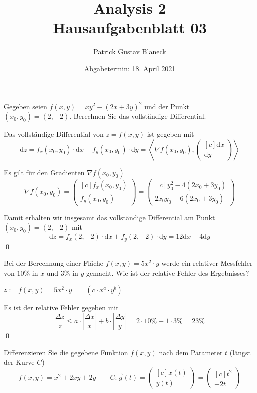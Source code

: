\documentclass[answers]{exam}
\title{Analysis 2 \\ \large{Hausaufgabenblatt 03}}
\author{Patrick Gustav Blaneck}
\date{Abgabetermin: 18. April 2021}
\newcommand{\abs}[1]{\left| #1 \right|}
\newcommand{\dx}{\mathrm{d}x} %
\newcommand{\dy}{\mathrm{d}y} %
\newcommand{\dz}{\mathrm{d}z} %
\newcommand{\scalarprod}[1]{\left\langle #1 \right\rangle}
\newcommand{\vektor}[1]{\begin{pmatrix*}[c] #1 \end{pmatrix*}}
\begin{document}
\maketitle
\begin{questions}
    \question
    Gegeben seien $f(x, y) = xy^2 - (2x+3y)^2$ und der Punkt $(x_0, y_0) = (2, -2)$.
    Berechnen Sie das vollständige Differential.
    \begin{solution}
        Das vollständige Differential von $z = f(x, y)$ ist gegeben mit
        $$
            \dz = f_x(x_0, y_0) \cdot \dx + f_y(x_0, y_0) \cdot \dy = \scalarprod{\nabla f(x_0, y_0), \vektor{\dx \\ \dy}}
        $$

        Es gilt für den Gradienten $\nabla f(x_0, y_0)$
        $$
            \nabla f(x_0, y_0) = \vektor{f_x(x_0, y_0) \\ f_y(x_0, y_0)} = \vektor{y_0^2 - 4(2x_0+3y_0) \\ 2x_0y_0 - 6(2x_0+3y_0)}
        $$

        Damit erhalten wir insgesamt das vollständige Differential am Punkt $(x_0, y_0) = (2, -2)$ mit
        $$
            \dz = f_x(2, -2) \cdot \dx + f_y(2, -2) \cdot \dy = 12\dx + 4\dy
        $$\qed
    \end{solution}

    \newpage

    \question
    Bei der Berechnung einer Fläche $f(x, y) = 5x^2 \cdot y$ werde ein relativer Messfehler von $10\%$ in $x$ und $3\%$ in $y$ gemacht.
    Wie ist der relative Fehler des Ergebnisses?
    \begin{solution}
        $z := f(x, y) = 5x^2 \cdot y \qquad \left( c \cdot x^a \cdot y^b\right)$

        Es ist der relative Fehler gegeben mit
        $$
            \frac{\varDelta z}{z} \leq a \cdot \abs{\frac{\varDelta x}{x}} + b \cdot \abs{\frac{\varDelta y}{y}} = 2 \cdot 10\% + 1\cdot 3\% = 23\%
        $$\qed
    \end{solution}

    \newpage

    \question
    Differenzieren Sie die gegebene Funktion $f(x,y)$ nach dem Parameter $t$ (längst der Kurve $C$)
    $$
        f(x, y) = x^2 + 2xy + 2y \qquad C : \vec{g}(t) = \vektor{x(t) \\ y(t)} = \vektor{t^2 \\ -2t}
    $$

    \begin{parts}

\end{parts}
\end{questions}
\end{document}
